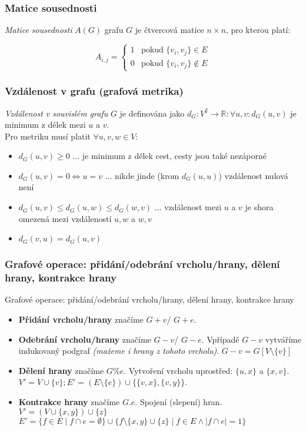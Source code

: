 \documentclass[10pt,a4paper]{article}
\newcommand{\R}{{\mathbb{R}}}
\begin{document}
\subsubsection{Matice sousednosti}
\textit{Matice sousednosti} $A(G)$ grafu $G$ je čtvercová matice $n\times n$, pro kterou platí:

\[
    A_{i,j} = 
    \begin{cases}
        1 & \text{pokud }\{v_i, v_j\} \in E\\
        0 & \text{pokud }\{v_i, v_j\} \notin E
    \end{cases}
\]

\subsubsection{Vzdálenost v grafu (grafová metrika)}
\textit{Vzdálenost v souvislém grafu} $G$ je definována jako $d_G: V^2 \to \R: \forall u,v: d_G(u,v)$ je minimum z délek mezi $u$ a $v$.\\

Pro metriku musí platit $\forall u,v,w \in V$:
\begin{itemize}
    \item $d_G(u,v) \geq 0$ ... je minimum z délek cest, cesty jsou také nezáporné
    \item $d_G(u,v) = 0 \iff u = v$ ... nikde jinde (krom $d_G(u,u)$) vzdálenost nulová není
    \item $d_G(u,v) \leq d_G(u,w)\leq d_G(w,v)$ ... vzdálenost mezi $u$ a $v$ je shora omezená mezi vzdáleností $u,w$ a $w,v$
    \item $d_G(v,u) = d_G(u,v)$
\end{itemize}
\subsubsection{Grafové operace: přidání/odebrání vrcholu/hrany, dělení hrany, kontrakce hrany}
Grafové operace: přidání/odebrání vrcholu/hrany, dělení hrany, kontrakce hrany

\begin{itemize}
    \item \textbf{Přidání vrcholu/hrany} značíme $G+v$/ $G+e$.
    \item \textbf{Odebrání vrcholu/hrany} značíme $G-v$/ $G-e$. Vpřípadě $G-v$ vytváříme indukovaný podgraf \textit{(mažeme i hrany z tohoto vrcholu)}. $G-v = G[V\setminus \{v\}]$
    \item \textbf{Dělení hrany} značíme $G\%e$. Vytvoření vrcholu uprostřed: $\{u, x\}$ a $\{x, v\}$.\\$V' = V\cup \{v\}; E' = (E\setminus \{e\}) \cup \{\{v,x\}, \{v, y\}\}$.
    \item \textbf{Kontrakce hrany} značíme $G.e$. Spojení (slepení) hran. $V' = (V\cup \{x,y\}) \cup \{z\}$\\ $E' = \{f\in E\mid f\cap e = \emptyset\}\cup \{f\setminus\{x,y\} \cup \{z\} \mid f\in E \land |f\cap e| = 1\}$
\end{itemize}
\end{document}
